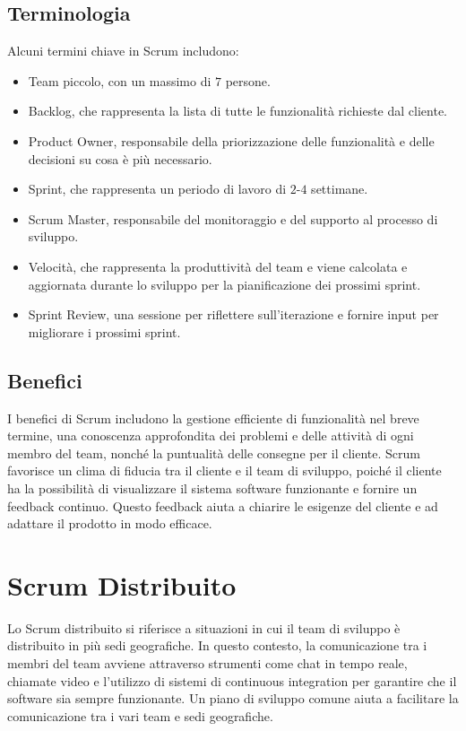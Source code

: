 \subsection{Terminologia}
Alcuni termini chiave in Scrum includono:

\begin{itemize}
    \item Team piccolo, con un massimo di $7$ persone.
    \item Backlog, che rappresenta la lista di tutte le funzionalità richieste dal cliente.
    \item Product Owner, responsabile della priorizzazione delle funzionalità e delle decisioni su cosa è più necessario.
    \item Sprint, che rappresenta un periodo di lavoro di $2$-$4$ settimane.
    \item Scrum Master, responsabile del monitoraggio e del supporto al processo di sviluppo.
    \item Velocità, che rappresenta la produttività del team e viene calcolata e aggiornata durante lo sviluppo per la
    pianificazione dei prossimi sprint.
    \item Sprint Review, una sessione per riflettere sull'iterazione e fornire input per migliorare i prossimi sprint.
\end{itemize}

\subsection{Benefici}
I benefici di Scrum includono la gestione efficiente di funzionalità nel breve termine, una conoscenza approfondita
dei problemi e delle attività di ogni membro del team, nonché la puntualità delle consegne per il cliente. Scrum favorisce
un clima di fiducia tra il cliente e il team di sviluppo, poiché il cliente ha la possibilità di visualizzare il sistema software
funzionante e fornire un feedback continuo. Questo feedback aiuta a chiarire le esigenze del cliente e ad adattare il prodotto
in modo efficace.

\section{Scrum Distribuito}
Lo Scrum distribuito si riferisce a situazioni in cui il team di sviluppo è distribuito in più sedi geografiche. In questo contesto,
la comunicazione tra i membri del team avviene attraverso strumenti come chat in tempo reale, chiamate video e l'utilizzo di sistemi
di continuous integration per garantire che il software sia sempre funzionante. Un piano di sviluppo comune aiuta a facilitare la
comunicazione tra i vari team e sedi geografiche.

